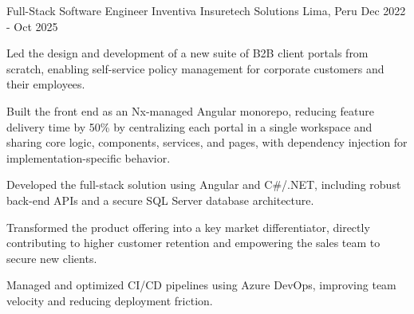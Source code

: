 

\begin{cventries}

  \cventry
    {Full-Stack Software Engineer} %
    {Inventiva Insuretech Solutions} %
    {Lima, Peru} %
    {Dec 2022 - Oct 2025} %
    {
      \begin{cvitems} %
        \item {Led the design and development of a new suite of B2B client portals from scratch, enabling self-service policy management for corporate customers and their employees.}
        \item {Built the front end as an Nx-managed Angular monorepo, reducing feature delivery time by 50\% by centralizing each portal in a single workspace and sharing core logic, components, services, and pages, with dependency injection for implementation-specific behavior.}
        \item {Developed the full-stack solution using Angular and C\#/.NET, including robust back-end APIs and a secure SQL Server database architecture.}
        \item {Transformed the product offering into a key market differentiator, directly contributing to higher customer retention and empowering the sales team to secure new clients.}
        \item {Managed and optimized CI/CD pipelines using Azure DevOps, improving team velocity and reducing deployment friction.}
      \end{cvitems}
    }

\end{cventries}
